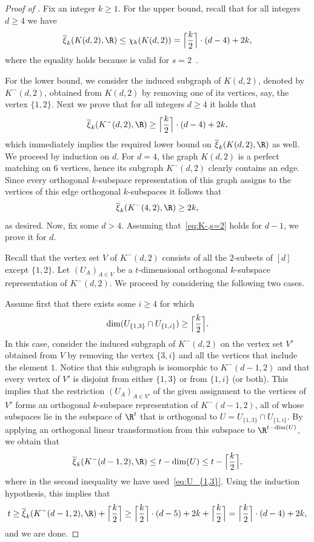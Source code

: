 \documentclass{toc}
\newcommand{\od}{\overline{\xi}}
\begin{document}
\begin{proof}[Proof of ]
Fix an integer $k \geq 1$.
For the upper bound, recall that for all integers $d \geq 4$ we have
\[\od_{k}(K(d,2),\R) \leq \chi_k(K(d,2)) = \Big \lceil \frac{k}{2} \Big \rceil \cdot (d-4)+2k,\]
where the equality holds because  is valid for $s=2$~\cite{Stahl98}.

For the lower bound, we consider the induced subgraph of $K(d,2)$, denoted by $K^{-}(d,2)$, obtained from $K(d,2)$ by removing one of its vertices, say, the vertex $\{1,2\}$.
%
Next we prove  %
that for all integers $d \geq 4$ it holds that
\begin{eqnarray}\label{eq:K-,s=2}
\od_{k}(K^{-}(d,2),\R) \geq \Big \lceil \frac{k}{2} \Big \rceil \cdot (d-4)+2k,
\end{eqnarray}
which immediately implies the required lower bound on $\od_{k}(K(d,2),\R)$ as well.
%
We proceed by  %
induction on $d$.
For $d=4$, the graph $K(d,2)$ is a perfect matching on $6$ vertices, hence its subgraph $K^{-}(d,2)$ clearly contains an edge. Since every orthogonal $k$-subspace representation of this graph assigns to the vertices of this edge orthogonal $k$-subspaces it follows that \[\od_k(K^{-}(4,2),\R) \geq 2k,\]
as desired.
Now, fix some $d > 4$. Assuming that~\eqref{eq:K-,s=2} holds for $d-1$,
we %
prove it for $d$.

Recall that the vertex set $V$ of $K^{-}(d,2)$ consists of all the $2$-subsets of $[d]$ except $\{1,2\}$.
Let $(U_A)_{A \in V}$ be a $t$-dimensional orthogonal $k$-subspace representation of $K^{-}(d,2)$.
We proceed by considering the following two cases.

Assume first that there exists some $i \geq 4$ for which
\begin{eqnarray}\label{eq:U_{1,3}}
\dim(U_{\{1,3\}} \cap U_{\{1,i\}}) \geq \Big\lceil \frac{k}{2} \Big\rceil.
\end{eqnarray}
In this case, consider the induced subgraph of $K^{-}(d,2)$ on the vertex set $V'$ obtained from $V$ by removing the vertex $\{3,i\}$ and all the vertices that include the element $1$.
Notice that this subgraph is isomorphic to $K^{-}(d-1,2)$ and that every vertex of $V'$ is disjoint from either $\{1,3\}$ or from $\{1,i\}$ (or both).
This implies that the restriction $(U_A)_{A \in V'}$ of the given assignment to the vertices of $V'$ forms an orthogonal $k$-subspace representation of $K^{-}(d-1,2)$, all of whose subspaces lie in the subspace of $\R^t$ that is orthogonal to $U = U_{\{1,3\}} \cap U_{\{1,i\}}$.
By applying an orthogonal linear transformation from this subspace to $\R^{t-\dim(U)}$, we obtain that
\[ \od_k(K^{-}(d-1,2),\R) \leq t- \dim(U) \leq t- \Big\lceil \frac{k}{2} \Big\rceil,\]
where in the second inequality we have used~\eqref{eq:U_{1,3}}.
Using the induction hypothesis, this implies that
\[ t \geq \od_k(K^{-}(d-1,2),\R) + \Big\lceil \frac{k}{2} \Big\rceil \geq \Big \lceil \frac{k}{2} \Big \rceil \cdot (d-5)+2k + \Big\lceil \frac{k}{2} \Big\rceil = \Big \lceil \frac{k}{2} \Big \rceil \cdot (d-4)+2k,\]
and we are done.


\end{proof}
\end{document}
